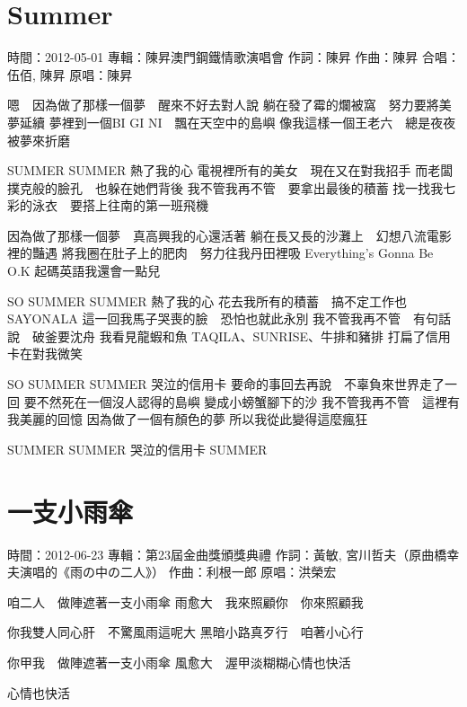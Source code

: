 \documentclass[UTF8,a4paper,oneside,twocolumn,12pt]{ctexbook}
\newcommand{\infopair}[2]{\textbullet #1：#2}
\newcommand{\zc}[1][伍佰]{\infopair{作詞}{#1}}
\newcommand{\zq}[1][伍佰]{\infopair{作曲}{#1}}
\newcommand{\zj}[1]{\infopair{專輯}{#1}}
\newcommand{\yc}[1]{\infopair{原唱}{#1}}
\newcommand{\sj}[1]{\infopair{時間}{#1}}
\newenvironment{info}{\begin{flushleft}\kaishu
	}
	{\end{flushleft}\normalsize\yahei\par}
\newenvironment{lyric}{
	}
{}
\begin{document}
\section{Summer}%
\begin{info}
	\sj{2012-05-01}
	\zj{陳昇澳門鋼鐵情歌演唱會}
	\zc[陳昇]
	\zq[陳昇]
	\infopair{合唱}{伍佰, 陳昇}
	\yc{陳昇}
\end{info}
\begin{lyric}
	嗯　因為做了那樣一個夢　醒來不好去對人說
	躺在發了霉的爛被窩　努力要將美夢延續
	夢裡到一個BI GI NI　飄在天空中的島嶼
	像我這樣一個王老六　總是夜夜被夢來折磨

	SUMMER SUMMER 熱了我的心
	電視裡所有的美女　現在又在對我招手
	而老闆撲克般的臉孔　也躲在她們背後
	我不管我再不管　要拿出最後的積蓄
	找一找我七彩的泳衣　要搭上往南的第一班飛機

	因為做了那樣一個夢　真高興我的心還活著
	躺在長又長的沙灘上　幻想八流電影裡的豔遇
	將我圈在肚子上的肥肉　努力往我丹田裡吸
	Everything's Gonna Be O.K
	起碼英語我還會一點兒

	SO SUMMER SUMMER 熱了我的心
	花去我所有的積蓄　搞不定工作也 SAYONALA
	這一回我馬子哭喪的臉　恐怕也就此永別
	我不管我再不管　有句話說　破釜要沈舟
	我看見龍蝦和魚 TAQILA、SUNRISE、牛排和豬排
	打扁了信用卡在對我微笑

	SO SUMMER SUMMER 哭泣的信用卡
	要命的事回去再說　不辜負來世界走了一回
	要不然死在一個沒人認得的島嶼
	變成小螃蟹腳下的沙
	我不管我再不管　這裡有我美麗的回憶
	因為做了一個有顏色的夢
	所以我從此變得這麼瘋狂

	SUMMER
	SUMMER 哭泣的信用卡
	SUMMER
\end{lyric}

\section{一支小雨傘}
\begin{info}
	\sj{2012-06-23}
	\zj{第23屆金曲獎頒獎典禮}
	\zc[黃敏, 宮川哲夫（原曲橋幸夫演唱的《雨の中の二人》）]
	\zq[利根一郎]
	\yc{洪榮宏}
\end{info}
\begin{lyric}
	咱二人　做陣遮著一支小雨傘
	雨愈大　我來照顧你　你來照顧我

	你我雙人同心肝　不驚風雨這呢大
	黑暗小路真歹行　咱著小心行

	你甲我　做陣遮著一支小雨傘
	風愈大　渥甲淡糊糊心情也快活

	心情也快活
\end{lyric}
\end{document}

